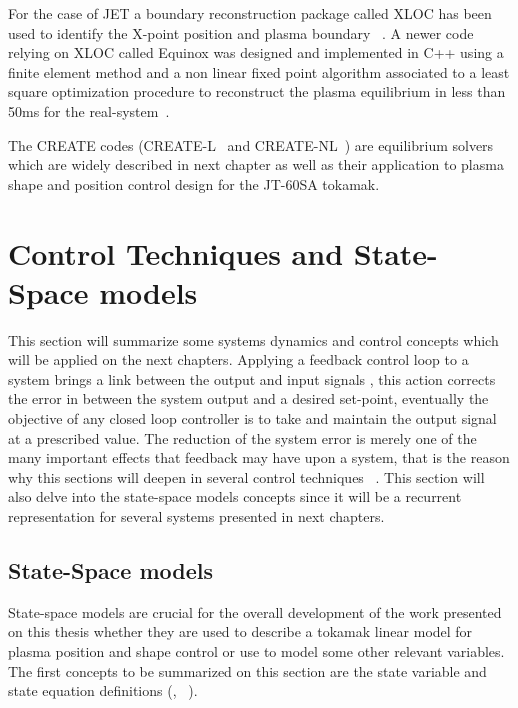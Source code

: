 For the case of JET  a  boundary reconstruction package called XLOC has been used to identify the X-point position and plasma boundary ~\cite{xloc}.  A newer code relying on XLOC  called Equinox was designed and implemented in C++ using a finite element method and a non linear fixed point algorithm associated to a least  square optimization procedure to reconstruct the plasma equilibrium in less than 50ms for the real-system~\cite{equinox}. 
\smallskip


The CREATE  codes (CREATE-L~\cite{Albanese:CREATEL} and CREATE-NL~\cite{Albanese:CREATENL}) are  equilibrium solvers which are widely described in next chapter as well as their application to plasma shape and position control design for the JT-60SA tokamak.
 


\section{Control Techniques and State-Space models}

This section will summarize  some systems dynamics and control  concepts which will be applied on the next chapters. Applying a feedback control loop to a system  brings a link between the output and input signals , this action corrects the error in between the system output and a desired set-point,  eventually  the objective  of any closed loop controller is to take and maintain  the output signal at a prescribed value. The reduction of the system error is merely one of the many important effects that feedback may have upon a system, that is the reason why this sections will deepen in several control techniques ~\cite[Chapter~1]{Golnaraghi2010}. This section will also delve into the state-space models concepts since it will be a recurrent representation  for several systems presented in next chapters.

\smallskip

\subsection{State-Space models}
\label{SS_subsec}
State-space models are  crucial for the overall development of the work presented on this thesis whether they are used to describe a tokamak linear model for plasma position and  shape control or use to model some other relevant variables.  The first concepts  to be summarized on this section are the state variable and state equation definitions (\cite[Chapter~10]{Golnaraghi2010}, ~\cite[Chapter~2]{Kailath1980}).   \smallskip

